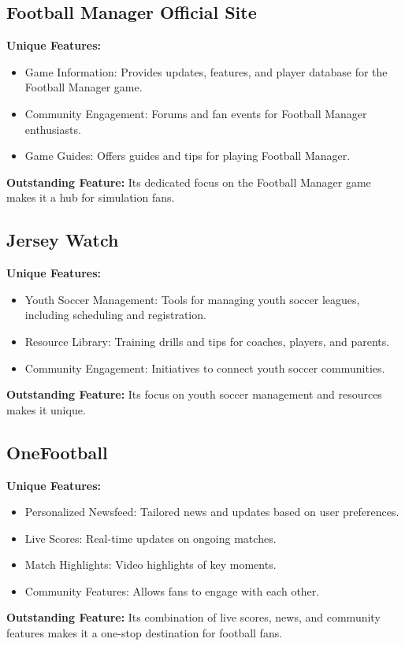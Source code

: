 \subsection{Football Manager Official Site}
\textbf{Unique Features:}
\begin{itemize}
    \item Game Information: Provides updates, features, and player database for the Football Manager game.
    \item Community Engagement: Forums and fan events for Football Manager enthusiasts.
    \item Game Guides: Offers guides and tips for playing Football Manager.
\end{itemize}
\textbf{Outstanding Feature:} Its dedicated focus on the Football Manager game makes it a hub for simulation fans.

\subsection{Jersey Watch}
\textbf{Unique Features:}
\begin{itemize}
    \item Youth Soccer Management: Tools for managing youth soccer leagues, including scheduling and registration.
    \item Resource Library: Training drills and tips for coaches, players, and parents.
    \item Community Engagement: Initiatives to connect youth soccer communities.
\end{itemize}
\textbf{Outstanding Feature:} Its focus on youth soccer management and resources makes it unique.

\subsection{OneFootball}
\textbf{Unique Features:}
\begin{itemize}
    \item Personalized Newsfeed: Tailored news and updates based on user preferences.
    \item Live Scores: Real-time updates on ongoing matches.
    \item Match Highlights: Video highlights of key moments.
    \item Community Features: Allows fans to engage with each other.
\end{itemize}
\textbf{Outstanding Feature:} Its combination of live scores, news, and community features makes it a one-stop destination for football fans.

